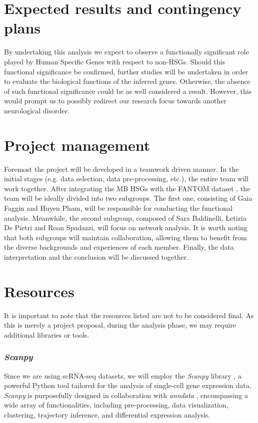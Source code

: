 \documentclass[10pt]{SelfArx} %
\begin{document}
\section{Expected results and contingency plans}\label{sec:expected_results}
By undertaking this analysis we expect to observe a functionally significant role played by Human Specific Genes with respect to non-HSGs. Should this functional significance be confirmed, further studies will be undertaken in order to evaluate the biological functions of the inferred genes. Otherwise, the absence of such functional significance could be as well considered a result. However, this would prompt us to possibly redirect our research focus towards another neurological disorder. 

\section{Project management}\label{sec:management}
Foremost the project will be developed in a teamwork driven manner. In the initial stages (e.g. data selection, data pre-processing, etc.), the entire team will work together. After integrating the MB HSGs with the FANTOM dataset \cite{fantom5}, the team will be ideally divided into two subgroups. The first one, consisting of Gaia Faggin and Huyen Pham, will be responsible for conducting the functional analysis. Meanwhile, the second subgroup, composed of Sara Baldinelli, Letizia De Pietri and Roan Spadazzi, will focus on network analysis. It is worth noting that both subgroups will maintain collaboration, allowing them to benefit from the diverse backgrounds and experiences of each member. Finally, the data interpretation and the conclusion will be discussed together.

\section{Resources}\label{sec:resources}
It is important to note that the resources listed are not to be considered final. As this is merely a project proposal, during the analysis phase, we may require additional libraries or tools.

\subsubsection*{\textit{Scanpy}}\label{sec:scanpy}
Since we are using scRNA-seq datasets, we will employ the \textit{Scanpy} library \cite{wolf2018scanpy}, a powerful Python tool tailored for the analysis of single-cell gene expression data. \textit{Scanpy} is purposefully designed in collaboration with \textit{anndata} \cite{virshup2021anndata}, encompassing a wide array of functionalities, including pre-processing, data visualization, clustering, trajectory inference, and differential expression analysis. 
\end{document}
